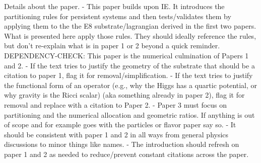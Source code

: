 Details about the paper. 
- This paper builds upon IE. It introduces the partitioning rules for persistent systems and then tests/validates them by applying them to the the E8 substrate/lagrangian derived in the first two papers. What is presented here  apply those rules. They should ideally reference the rules, but don't re-explain what is in paper 1 or 2 beyond a quick reminder.
DEPENDENCY-CHECK: This paper is the numerical culmination of Papers 1 and 2.
- If the text tries to justify the geometry of the substrate that should be a citation to paper 1, flag it for removal/simplification.
- If the text tries to justify the functional form of an operator (e.g., why the Higgs has a quartic potential, or why gravity is the Ricci scalar) (aka something already in paper 2), flag it for removal and replace with a citation to Paper 2.
- Paper 3 must focus on partitioning and the numerical allocation and geometric ratios.  If anything is out of scope and for example goes with the particles or flavor paper say so.
- It should be consistent with paper 1 and 2 in all ways from general physics discussions to minor things like names.
- The introduction should refresh on paper 1 and 2 as needed to reduce/prevent constant citations across the paper.
